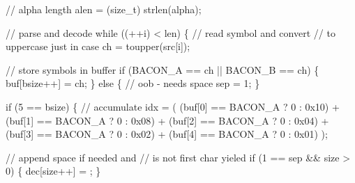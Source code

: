 \documentclass[
  a4paper,
]{scrreprt}
\newenvironment{Shaded}{\begin{snugshade}}{\end{snugshade}}
\newcommand{\BaseNTok}[1]{\textcolor[rgb]{0.47,0.16,0.63}{#1}}
\newcommand{\CharTok}[1]{\textcolor[rgb]{0.00,0.50,0.00}{#1}}
\newcommand{\CommentTok}[1]{\textcolor[rgb]{0.41,0.41,0.41}{#1}}
\newcommand{\ControlFlowTok}[1]{\textcolor[rgb]{0.85,0.12,0.09}{#1}}
\newcommand{\DataTypeTok}[1]{\textcolor[rgb]{0.47,0.16,0.63}{#1}}
\newcommand{\DecValTok}[1]{\textcolor[rgb]{0.47,0.16,0.63}{#1}}
\newcommand{\NormalTok}[1]{\textcolor[rgb]{0.33,0.33,0.33}{#1}}
\newcommand{\OperatorTok}[1]{\textcolor[rgb]{0.00,0.46,0.62}{#1}}
\theoremstyle{definition}
\theoremstyle{remark}
\begin{document}
\begin{Shaded}
\begin{Highlighting}[numbers=left,,]
  \CommentTok{// alpha length}
\NormalTok{  alen }\OperatorTok{=} \OperatorTok{(}\DataTypeTok{size\_t}\OperatorTok{)}\NormalTok{ strlen}\OperatorTok{(}\NormalTok{alpha}\OperatorTok{);}

  \CommentTok{// parse and decode}
  \ControlFlowTok{while} \OperatorTok{((++}\NormalTok{i}\OperatorTok{)} \OperatorTok{\textless{}}\NormalTok{ len}\OperatorTok{)} \OperatorTok{\{}
    \CommentTok{// read symbol and convert}
    \CommentTok{// to uppercase just in case}
\NormalTok{    ch }\OperatorTok{=}\NormalTok{ toupper}\OperatorTok{(}\NormalTok{src}\OperatorTok{[}\NormalTok{i}\OperatorTok{]);}

    \CommentTok{// store symbols in buffer}
    \ControlFlowTok{if} \OperatorTok{(}\NormalTok{BACON\_A }\OperatorTok{==}\NormalTok{ ch }\OperatorTok{||}\NormalTok{ BACON\_B }\OperatorTok{==}\NormalTok{ ch}\OperatorTok{)} \OperatorTok{\{}
\NormalTok{      buf}\OperatorTok{[}\NormalTok{bsize}\OperatorTok{++]} \OperatorTok{=}\NormalTok{ ch}\OperatorTok{;}
    \OperatorTok{\}} \ControlFlowTok{else} \OperatorTok{\{}
      \CommentTok{// oob {-} needs space}
\NormalTok{      sep }\OperatorTok{=} \DecValTok{1}\OperatorTok{;}
    \OperatorTok{\}}

    \ControlFlowTok{if} \OperatorTok{(}\DecValTok{5} \OperatorTok{==}\NormalTok{ bsize}\OperatorTok{)} \OperatorTok{\{}
      \CommentTok{// accumulate}
\NormalTok{      idx }\OperatorTok{=} \OperatorTok{(}
          \OperatorTok{(}\NormalTok{buf}\OperatorTok{[}\DecValTok{0}\OperatorTok{]} \OperatorTok{==}\NormalTok{ BACON\_A }\OperatorTok{?} \DecValTok{0} \OperatorTok{:} \BaseNTok{0x10}\OperatorTok{)} \OperatorTok{+}
          \OperatorTok{(}\NormalTok{buf}\OperatorTok{[}\DecValTok{1}\OperatorTok{]} \OperatorTok{==}\NormalTok{ BACON\_A }\OperatorTok{?} \DecValTok{0} \OperatorTok{:} \BaseNTok{0x08}\OperatorTok{)} \OperatorTok{+}
          \OperatorTok{(}\NormalTok{buf}\OperatorTok{[}\DecValTok{2}\OperatorTok{]} \OperatorTok{==}\NormalTok{ BACON\_A }\OperatorTok{?} \DecValTok{0} \OperatorTok{:} \BaseNTok{0x04}\OperatorTok{)} \OperatorTok{+}
          \OperatorTok{(}\NormalTok{buf}\OperatorTok{[}\DecValTok{3}\OperatorTok{]} \OperatorTok{==}\NormalTok{ BACON\_A }\OperatorTok{?} \DecValTok{0} \OperatorTok{:} \BaseNTok{0x02}\OperatorTok{)} \OperatorTok{+}
          \OperatorTok{(}\NormalTok{buf}\OperatorTok{[}\DecValTok{4}\OperatorTok{]} \OperatorTok{==}\NormalTok{ BACON\_A }\OperatorTok{?} \DecValTok{0} \OperatorTok{:} \BaseNTok{0x01}\OperatorTok{)} 
       \OperatorTok{);}

      \CommentTok{// append space if needed and}
      \CommentTok{// is not first char yieled}
      \ControlFlowTok{if} \OperatorTok{(}\DecValTok{1} \OperatorTok{==}\NormalTok{ sep }\OperatorTok{\&\&}\NormalTok{ size }\OperatorTok{\textgreater{}} \DecValTok{0}\OperatorTok{)} \OperatorTok{\{}
\NormalTok{        dec}\OperatorTok{[}\NormalTok{size}\OperatorTok{++]} \OperatorTok{=} \CharTok{\textquotesingle{} \textquotesingle{}}\OperatorTok{;}
      \OperatorTok{\}}


\end{Highlighting}
\end{Shaded}
\end{document}
